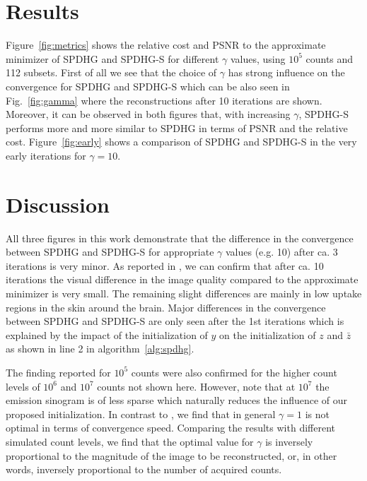 \documentclass[11pt,twocolumn,twoside]{article}
\begin{document}


\section{Results}

Figure~\ref{fig:metrics} shows the relative cost and PSNR to the approximate minimizer of 
SPDHG and SPDHG-S for different $\gamma$ values, using $10^5$ counts and 112 subsets.
First of all we see that the choice of $\gamma$ has strong influence on the convergence for
SPDHG and SPDHG-S which can be also seen in Fig.~\ref{fig:gamma} where the reconstructions
after 10 iterations are shown. 
Moreover, it can be observed in both figures that, 
with increasing $\gamma$, SPDHG-S performs more and more similar to SPDHG in terms 
of PSNR and the relative cost.
Figure~\ref{fig:early} shows a comparison of SPDHG and SPDHG-S in the very early iterations
for $\gamma = 10$.

\section{Discussion}

All three figures in this work demonstrate that the difference in the convergence between 
SPDHG and SPDHG-S for appropriate $\gamma$ values (e.g. 10) after ca. 3 iterations is very minor.
As reported in \cite{Ehrhardt2019}, we can confirm that after ca. 10 iterations the visual difference
in the image quality compared to the approximate minimizer is very small.
The remaining slight differences are mainly in low uptake regions in the skin around the brain.
Major differences in the convergence between SPDHG and SPDHG-S are only seen after the
1st iterations which is explained by the impact of the initialization of $y$ on the initialization
of $z$ and $\bar{z}$ as shown in line 2 in algorithm~\ref{alg:spdhg}.

The finding reported for $10^5$ counts were also confirmed for the higher count levels 
of $10^6$ and $10^7$ counts not shown here. 
However, note that at $10^7$ the emission sinogram is of less sparse
which naturally reduces the influence of our proposed initialization.
In contrast to \cite{Ehrhardt2019}, we find that in general $\gamma = 1$ is not optimal
in terms of convergence speed. 
Comparing the results with different simulated count levels, we find that the optimal value
for $\gamma$ is inversely proportional to the magnitude of the image to be reconstructed, or, 
in other words, inversely proportional to the number of acquired counts.
\end{document}

